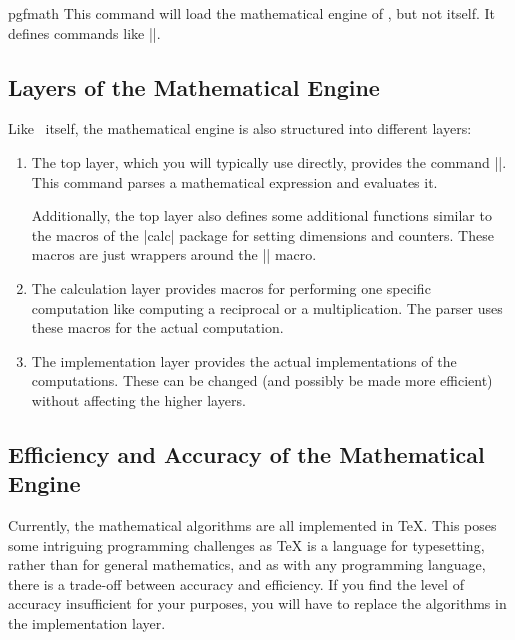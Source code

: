 \begin{package}{pgfmath}
    This command will load the mathematical engine of \pgfname, but not
    \pgfname{} itself. It defines commands like |\pgfmathparse|.
\end{package}


\subsection{Layers of the Mathematical Engine}

Like \pgfname\ itself, the mathematical engine is also structured into
different layers:
%
\begin{enumerate}
    \item The top layer, which you will typically use directly, provides the
        command |\pgfmathparse|. This command parses a mathematical expression
        and evaluates it.

        Additionally, the top layer also defines some additional functions
        similar to the macros of the |calc| package for setting dimensions and
        counters. These macros are just wrappers around the |\pgfmathparse|
        macro.

    \item The calculation layer provides macros for performing one specific
        computation like computing a reciprocal or a multiplication. The parser
        uses these macros for the actual computation.
    \item The implementation layer provides the actual implementations of the
        computations. These can be changed (and possibly be made more
        efficient) without affecting the higher layers.
\end{enumerate}


\subsection{Efficiency and Accuracy of the Mathematical Engine}

Currently, the mathematical algorithms are all implemented in \TeX. This poses
some intriguing programming challenges as \TeX{} is a language for typesetting,
rather than for general mathematics, and as with any programming language,
there is a trade-off between accuracy and efficiency. If you find the level of
accuracy insufficient for your purposes, you will have to replace the
algorithms in the implementation layer.

